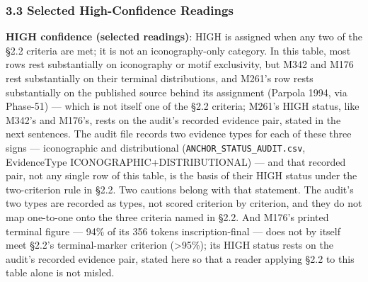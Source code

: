 \documentclass[
]{article}
\begin{document}
\subsubsection{3.3 Selected High-Confidence
Readings}\label{selected-high-confidence-readings}

\textbf{HIGH confidence (selected readings)}: HIGH is assigned when any two of the §2.2 criteria are met; it is not an iconography-only category. In this table, most rows rest substantially on iconography or motif exclusivity, but M342 and M176 rest substantially on their terminal distributions, and M261's row rests substantially on the published source behind its assignment (Parpola 1994, via Phase-51) --- which is not itself one of the §2.2 criteria; M261's HIGH status, like M342's and M176's, rests on the audit's recorded evidence pair, stated in the next sentences. The audit file records two evidence types for each of these three signs --- iconographic and distributional (\texttt{ANCHOR\_STATUS\_AUDIT.csv}, EvidenceType ICONOGRAPHIC+DISTRIBUTIONAL) --- and that recorded pair, not any single row of this table, is the basis of their HIGH status under the two-criterion rule in §2.2. Two cautions belong with that statement. The audit's two types are recorded as types, not scored criterion by criterion, and they do not map one-to-one onto the three criteria named in §2.2. And M176's printed terminal figure --- 94\% of its 356 tokens inscription-final --- does not by itself meet §2.2's terminal-marker criterion (\textgreater95\%); its HIGH status rests on the audit's recorded evidence pair, stated here so that a reader applying §2.2 to this table alone is not misled.
\end{document}
